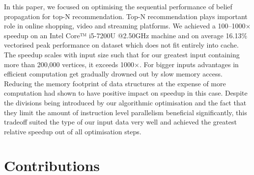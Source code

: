 \documentclass[final,letterpaper]{article}
\begin{document}
In this paper, we focused on optimising the sequential performance of belief propagation for top-N recommendation.
Top-N recommendation plays important role in online shopping, video and streaming platforms. 
We achieved a 100--1000$\times$ speedup on an Intel\circledR{} Core™ i5-7200U @2.50GHz machine and on average 16.13\% vectorised peak performance on dataset which does not fit entirely into cache.
The speedup scales with input size such that for our greatest input containing more than 200,000 vertices, it exceeds 1000$\times$.
For bigger inputs advantages in efficient computation get gradually drowned out by slow memory access.
Reducing the memory footprint of data structures at the expense of more computation had shown to have positive impact on speedup in this case.
Despite the divisions being introduced by our algorithmic optimisation and the fact that they limit the amount of instruction level parallelism beneficial significantly, this tradeoff suited the type of our input data very well and achieved the greatest relative speedup out of all optimisation steps.\sr{*}


\section{Contributions}%


\end{document}
